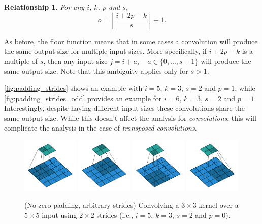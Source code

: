 \documentclass[notitlepage]{report}
\newtheorem{relationship}{Relationship}
\begin{document}
\begin{relationship}\label{rel:padding_strides}
For any $i$, $k$, $p$ and $s$,
\begin{equation*}
    o = \left\lfloor \frac{i + 2p - k}{s} \right\rfloor + 1.
\end{equation*}
\end{relationship}

\noindent As before, the floor function means that in some cases a convolution
will produce the same output size for multiple input sizes. More specifically,
if $i + 2p - k$ is a multiple of $s$, then any input size $j = i + a, \quad a
\in \{0,\ldots,s - 1\}$ will produce the same output size. Note that this
ambiguity applies only for $s > 1$.

\autoref{fig:padding_strides} shows an example with $i = 5$, $k = 3$, $s = 2$
and $p = 1$, while \autoref{fig:padding_strides_odd} provides an example for
$i = 6$, $k = 3$, $s = 2$ and $p = 1$. Interestingly, despite having different
input sizes these convolutions share the same output size. While this doesn't
affect the analysis for {\em convolutions}, this will complicate the analysis
in the case of {\em transposed convolutions}.

\begin{figure}[p]
    \centering
    \includegraphics[width=0.24\textwidth]{pdf/no_padding_strides_00.pdf}
    \includegraphics[width=0.24\textwidth]{pdf/no_padding_strides_01.pdf}
    \includegraphics[width=0.24\textwidth]{pdf/no_padding_strides_02.pdf}
    \includegraphics[width=0.24\textwidth]{pdf/no_padding_strides_03.pdf}
    \caption{\label{fig:no_padding_strides} (No zero padding, arbitrary
        strides) Convolving a $3 \times 3$ kernel over a $5 \times 5$ input
        using $2 \times 2$ strides (i.e., $i = 5$, $k = 3$, $s = 2$ and
        $p = 0$).}
\end{figure}
\end{document}
